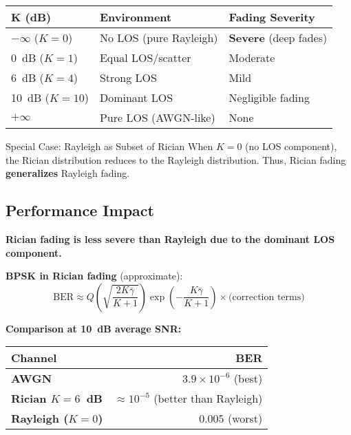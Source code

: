 \begin{center}
\begin{tabular}{lll}
\toprule
\textbf{K (dB)} & \textbf{Environment} & \textbf{Fading Severity} \\
\midrule
$-\infty$ ($K=0$) & No LOS (pure Rayleigh) & \textbf{Severe} (deep fades) \\
0~dB ($K=1$) & Equal LOS/scatter & Moderate \\
6~dB ($K=4$) & Strong LOS & Mild \\
10~dB ($K=10$) & Dominant LOS & Negligible fading \\
$+\infty$ & Pure LOS (AWGN-like) & None \\
\bottomrule
\end{tabular}
\end{center}

\begin{calloutbox}{Special Case: Rayleigh as Subset of Rician}
When $K = 0$ (no LOS component), the Rician distribution reduces to the Rayleigh distribution. Thus, Rician fading \textbf{generalizes} Rayleigh fading.
\end{calloutbox}

\subsection{Performance Impact}

\textbf{Rician fading is less severe than Rayleigh due to the dominant LOS component.}

\textbf{BPSK in Rician fading} (approximate):
\begin{equation}
\text{BER} \approx Q\left(\sqrt{\frac{2K\bar{\gamma}}{K+1}}\right) \exp\left(-\frac{K\bar{\gamma}}{K+1}\right) \times \text{(correction terms)}
\label{eq:bpsk-rician-ber}
\end{equation}

\textbf{Comparison at 10~dB average SNR:}
\begin{center}
\begin{tabular}{@{}lr@{}}
\toprule
Channel & BER \\
\midrule
\textbf{AWGN} & $3.9 \times 10^{-6}$ (best) \\
\textbf{Rician $K=6$~dB} & $\approx 10^{-5}$ (better than Rayleigh) \\
\textbf{Rayleigh ($K=0$)} & $0.005$ (worst) \\
\bottomrule
\end{tabular}
\end{center}

